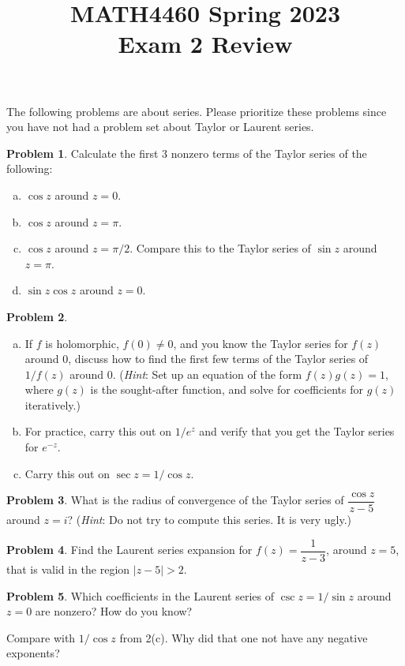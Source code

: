 \documentclass[11pt,oneside]{amsart}
\title{MATH4460 Spring 2023\\
Exam 2 Review}
\theoremstyle{definition}
\newtheorem{problem}{Problem}
\begin{document}
\maketitle

The following problems are about series. Please prioritize these problems since you have not had a problem set about Taylor or Laurent series.

\begin{problem}
  Calculate the first 3 nonzero terms of the Taylor series of the following:
  \begin{enumerate}[(a)]
    \item $\cos z$ around $z=0$.
    \item $\cos z$ around $z=\pi$.
    \item $\cos z$ around $z=\pi/2$. Compare this to the Taylor series of $\sin z$ around $z=\pi$.
    \item $\sin z\cos z$ around $z=0$.
  \end{enumerate}
\end{problem}

\begin{problem}
  \leavevmode\begin{enumerate}[(a)]
    \item If $f$ is holomorphic, $f(0)\neq 0$, and you know the Taylor series for $f(z)$ around 0, discuss how to find the first few terms of the Taylor series of $1/f(z)$ around 0. (\emph{Hint}: Set up an equation of the form $f(z)g(z)=1$, where $g(z)$ is the sought-after function, and solve for coefficients for $g(z)$ iteratively.)
    \item For practice, carry this out on $1/e^z$ and verify that you get the Taylor series for $e^{-z}$.
    \item Carry this out on $\sec z=1/\cos z$.
  \end{enumerate}
\end{problem}

\begin{problem}
  What is the radius of convergence of the Taylor series of $\dfrac{\cos z}{z-5}$ around $z=i$? (\emph{Hint}: Do not try to compute this series. It is very ugly.)
\end{problem}

\begin{problem}
  Find the Laurent series expansion for $f(z)=\dfrac 1{z-3}$, around $z=5$, that is valid in the region $|z-5| >2$.
\end{problem}

\begin{problem}
  Which coefficients in the Laurent series of $\csc z=1/\sin z$ around $z=0$ are nonzero? How do you know?
  
  Compare with $1/\cos z$ from 2(c). Why did that one not have any negative exponents?
\end{problem}
\end{document}
